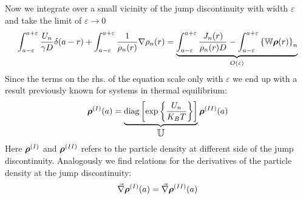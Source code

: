 Now we integrate over a small vicinity of the jump discontinuity with width $\varepsilon$ and take the limit of $\varepsilon \rightarrow 0$
    \begin{equation}
        \int_{a-\varepsilon}^{a + \varepsilon} \frac{U_n}{\gamma D}\delta(a-r) + \int_{a-\varepsilon}^{a + \varepsilon} \frac{1}{\rho_n(r)}\nabla \rho_n(r) = \underbrace{\int_{a - \varepsilon}^{a + \varepsilon}\frac{J_n(r)}{\rho_n(r) D} - \int_{a - \varepsilon} ^{a+ \varepsilon} \left\{ \mathbb{W} \boldsymbol{\mathbf{\rho}}(r)\right\}_{n}}_\text{$O(\varepsilon)$}
    \end{equation}
Since the terms on the rhs. of the equation scale only with $\varepsilon$ we end up with a result previously known for systems in thermal equilibrium:
\begin{equation}
    \boldsymbol{\mathbf{\rho}}^{(I)}(a) = \underbrace{ {\rm diag}\left[\exp\left\{\frac{U_n}{K_B T} \right\}\right]}_\text{\large$\mathbb{U}$} \boldsymbol{\mathbf{\rho}}^{(II)}(a)
\end{equation}
Here $\boldsymbol{\mathbf{\rho}}^{(I)}$ and $\boldsymbol{\mathbf{\rho}}^{(II)}$ refers to the particle density at different side of the jump discontinuity.
Analogously we find relations for the derivatives of the particle density at the jump discontinuity:
\begin{equation}
    \vec{\nabla}\boldsymbol{\mathbf{\rho}}^{(I)}(a) = \vec{\nabla}\boldsymbol{\mathbf{\rho}}^{(II)}(a)
\end{equation}

